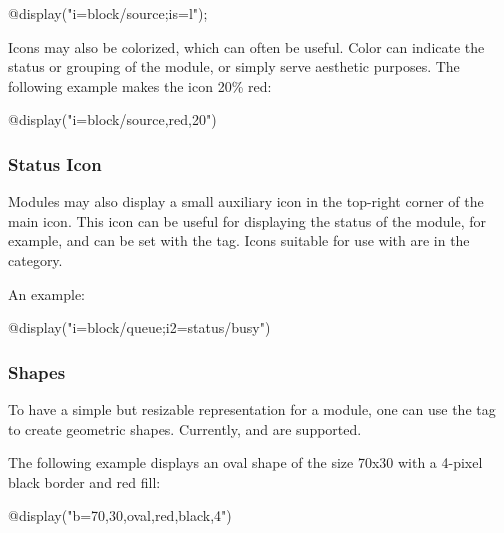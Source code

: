 \begin{ned}
@display("i=block/source;is=l");
\end{ned}

Icons may also be colorized, which can often be useful. Color can indicate
the status or grouping of the module, or simply serve aesthetic purposes.
The following example makes the icon 20\% red:

\begin{ned}
@display("i=block/source,red,20")
\end{ned}

\begin{center}
\end{center}

\subsubsection{Status Icon}
\label{sec:graphics:submodule-status-icon}

Modules may also display a small auxiliary icon in the top-right corner of
the main icon. This icon can be useful for displaying the status of the
module, for example, and can be set with the  tag. Icons suitable
for use with  are in the  category.

An example:

\begin{ned}
@display("i=block/queue;i2=status/busy")
\end{ned}

\begin{center}
\end{center}

\subsubsection{Shapes}
\label{sec:graphics:submodule-shapes}

To have a simple but resizable representation for a module, one can use
the  tag to create geometric shapes. Currently,  and
 are supported.

The following example displays an oval shape of the size 70x30 with a 4-pixel
black border and red fill:

\begin{ned}
@display("b=70,30,oval,red,black,4")
\end{ned}

\begin{center}
\end{center}

